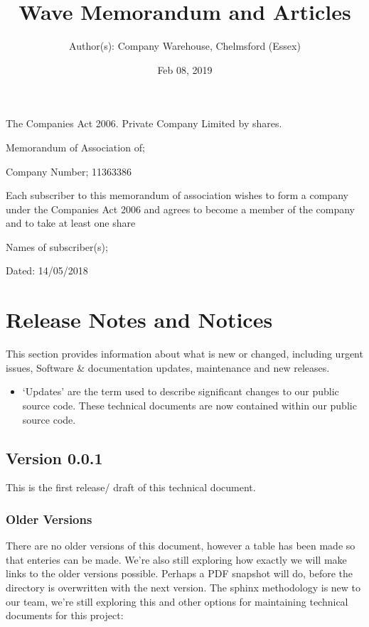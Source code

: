 \documentclass[letterpaper,10pt,openany,oneside,english]{sphinxmanual}
\title{Wave Memorandum and Articles}
\date{Feb 08, 2019}
\author{Author(s): Company Warehouse, Chelmsford (Essex)}
\begin{document}
\maketitle
\sphinxtableofcontents
{}\label{\detokenize{index::doc}}


The Companies Act 2006. Private Company Limited by shares.

Memorandum of Association of; 

Company Number; 11363386

Each subscriber to this memorandum of association wishes to form a company under the Companies Act 2006 and agrees to become a member of the company and to take at least one share

Names of subscriber(s); 

Dated: 14/05/2018


\chapter{Release Notes and Notices}
\label{\detokenize{releasenotes:release-notes-and-notices}}\label{\detokenize{releasenotes::doc}}
This section provides information about what is new or changed, including urgent issues, Software \& documentation updates, maintenance and new releases.
\begin{itemize}
\item {} 
‘Updates’ are the term used to describe significant changes to our public source code. These technical documents are now contained within our public source code.

\end{itemize}


\section{Version 0.0.1}
\label{\detokenize{releasenotes:version-0-0-1}}
This is the first release/ draft of this technical document.


\subsection{Older Versions}
\label{\detokenize{releasenotes:older-versions}}
There are no older versions of this document, however a table has been made so that enteries can be made. We’re also still exploring how exactly we will make links to the older versions possible. Perhaps a PDF snapshot will do, before the directory is overwritten with the next version. The sphinx methodology is new to our team, we’re still exploring this and other options for maintaining technical documents for this project:
\end{document}
